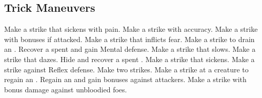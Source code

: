 \subsection{Trick Maneuvers}\label{Trick Maneuvers}
\begin{spelllist}
 Make a strike that sickens with pain.
 Make a strike with  accuracy.
 Make a strike with bonuses if attacked.
 Make a strike that inflicts fear.
 Make a strike to drain an .
 Recover a spent  and gain  Mental defense.
 Make a strike that slows.
 Make a strike that dazes.
 Hide and recover a spent .
 Make a strike that sickens.
 Make a strike against Reflex defense.
 Make two strikes.
 Make a strike at a creature to regain an .
 Regain an  and gain bonuses against attackers.
 Make a strike with bonus damage against unbloodied foes.
\end{spelllist}



\small
